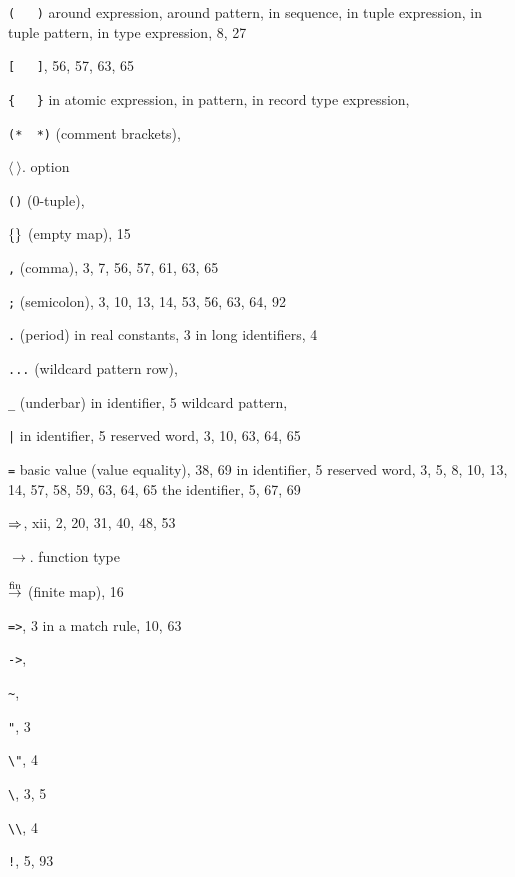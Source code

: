 \begin{theindex}
\item \verb+(   )+
\subitem around expression, \parexprefs
\subitem around pattern, \parpatrefs
\subitem in sequence,  \sequenceexprefs
\subitem in tuple expression, \tupleexprefs
\subitem in tuple pattern, \tuplepatrefs
\subitem in type expression, 8, 27
\item \verb+[   ]+, 56, 57, 63, 65
\item \verb+{   }+
\subitem in atomic expression, \recordexprefs
\subitem in pattern, \recordpatrefs
\subitem in record type expression, \bracestyexprefs
\item \verb+(*  *)+ (comment brackets), \commentrefs
\item $\langle\ \rangle$. \see option 
\item \verb+()+ (0-tuple), \zerotuplerefs
\item $\{\}$ (empty map), 15
\item \verb+,+ (comma), 3, 7, 56, 57, 61, 63, 65
\item \verb+;+ (semicolon), 3, 10, 13, 14, 53, 56, 63, 64, 92
\item \verb+.+ (period) 
\subitem in real constants, 3
\subitem in long identifiers, 4
\item \verb+...+ (wildcard pattern row), \dotdotdotrefs
\item \verb+_+ (underbar) 
\subitem in identifier, 5
\subitem wildcard pattern, \underscorewildrefs
\item \verb+|+
\subitem in identifier, 5
\subitem reserved word, 3, 10, 63, 64, 65
\item \verb+=+ 
\subitem basic value (value equality), 38, 69
\subitem in identifier, 5
\subitem reserved word, 3, 5, 8, 10, 13, 14, 57, 58, 59, 63, 64, 65
\subitem the identifier, 5, 67, 69
\item $\Rightarrow$, xii, 2, 20, 31, 40, 48, 53
\item $\rightarrow$. \see function type
\item $\stackrel{{\rm fin}}{\to}$ (finite map), 16
\item \verb+=>+, 3
\subitem in a match rule, 10, 63
\item \verb+->+, \funtyperefs
\item \verb+~+, \unaryminusrefs
\item \verb+"+, 3
\item \verb+\"+, 4
\item \verb+\+, 3, 5
\item \verb+\\+, 4
\item \verb+!+, 5, 93

\end{theindex}
